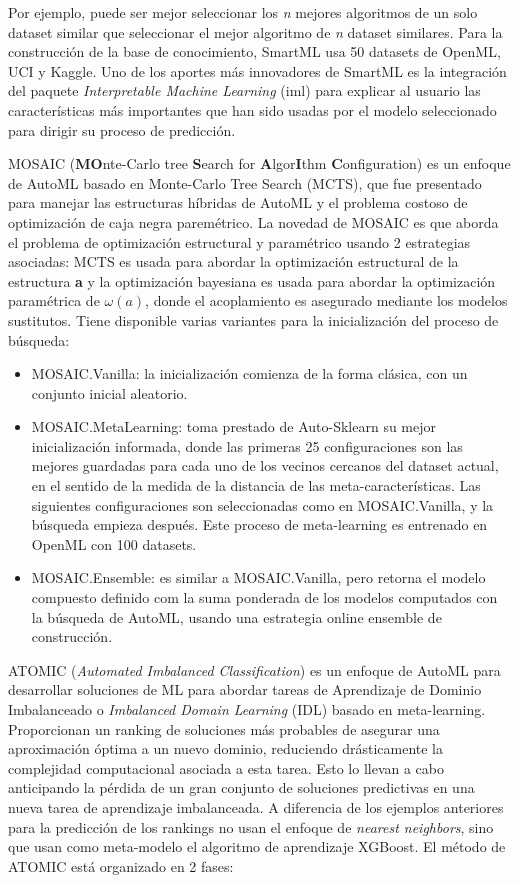 Por ejemplo, puede ser mejor seleccionar los \textit{n} mejores algoritmos de un solo dataset similar que seleccionar el mejor algoritmo de \textit{n} dataset similares. Para la construcción de la base de conocimiento, SmartML usa 50 datasets de OpenML, UCI y Kaggle. Uno de los aportes más innovadores de SmartML es la integración del paquete \textit{Interpretable Machine Learning} (iml) para explicar al usuario las características más importantes que han sido usadas por el modelo seleccionado para dirigir su proceso de predicción.

MOSAIC (\textbf{MO}nte-Carlo tree \textbf{S}earch for \textbf{A}lgor\textbf{I}thm \textbf{C}onfiguration) \cite{rakotoarison2019automated} es un enfoque de AutoML basado en Monte-Carlo Tree Search (MCTS), que fue presentado para manejar las estructuras híbridas de AutoML y el problema costoso de optimización de caja negra paremétrico. La novedad de MOSAIC es que aborda el problema de optimización estructural y paramétrico usando 2 estrategias asociadas: MCTS es usada para abordar la optimización estructural de la estructura \textbf{a} y la optimización bayesiana es usada para abordar la optimización paramétrica de $\omega(a)$, donde el acoplamiento es asegurado mediante los modelos sustitutos. Tiene disponible varias variantes para la inicialización del proceso de búsqueda:

\begin{itemize}
	\item MOSAIC.Vanilla: la inicialización comienza de la forma clásica, con un conjunto inicial aleatorio.
	\item MOSAIC.MetaLearning: toma prestado de Auto-Sklearn su mejor inicialización informada, donde las primeras 25 configuraciones son las mejores guardadas para cada uno de los vecinos cercanos del dataset actual, en el sentido de la medida de la distancia de las meta-características. Las siguientes configuraciones son seleccionadas como en MOSAIC.Vanilla, y la búsqueda empieza después. Este proceso de meta-learning es entrenado en OpenML con 100 datasets.
	\item MOSAIC.Ensemble: es similar a MOSAIC.Vanilla, pero retorna el modelo compuesto definido com la suma ponderada de los modelos computados con la búsqueda de AutoML, usando una estrategia online ensemble de construcción.
\end{itemize}

ATOMIC (\textit{Automated Imbalanced Classification}) \cite{atomic} es un enfoque de AutoML para desarrollar soluciones de ML para abordar tareas de Aprendizaje de Dominio Imbalanceado o \textit{Imbalanced Domain Learning} (IDL) basado en meta-learning. Proporcionan un ranking de soluciones más probables de asegurar una aproximación óptima a un nuevo dominio, reduciendo drásticamente la complejidad computacional asociada a esta tarea. Esto lo llevan a cabo anticipando la pérdida de un gran conjunto de soluciones predictivas en una nueva tarea de aprendizaje imbalanceada. A diferencia de los ejemplos anteriores para la predicción de los rankings no usan el enfoque de \textit{nearest neighbors}, sino que usan como meta-modelo el algoritmo de aprendizaje XGBoost. El método de ATOMIC está organizado en 2 fases:

